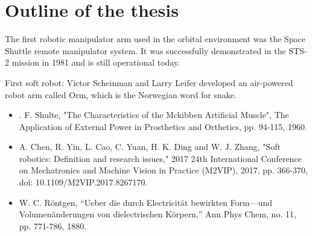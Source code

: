 \section{Outline of the thesis}



% 


The first robotic manipulator arm used in the orbital environment was the Space Shuttle remote manipulator system. It was successfully demonstrated in the STS-2 mission in 1981 and is still operational today.

First soft robot: Victor Scheinman and Larry Leifer developed an air-powered robot arm called Orm, which is the Norwegian word for snake.

\begin{itemize}
  \item . F. Shulte, "The Characteristics of the Mckibben Artificial Muscle", The Application of External Power in Prosthetics and Orthetics, pp. 94-115, 1960.
  \item A. Chen, R. Yin, L. Cao, C. Yuan, H. K. Ding and W. J. Zhang, "Soft robotics: Definition and research issues," 2017 24th International Conference on Mechatronics and Machine Vision in Practice (M2VIP), 2017, pp. 366-370, doi: 10.1109/M2VIP.2017.8267170.
  \item  W. C. R\"{o}ntgen, “Ueber die durch Electricität bewirkten Form—und Volumenänderungen von dielectrischen Körpern,” Ann Phys Chem, no. 11, pp. 771-786, 1880.
\end{itemize}

